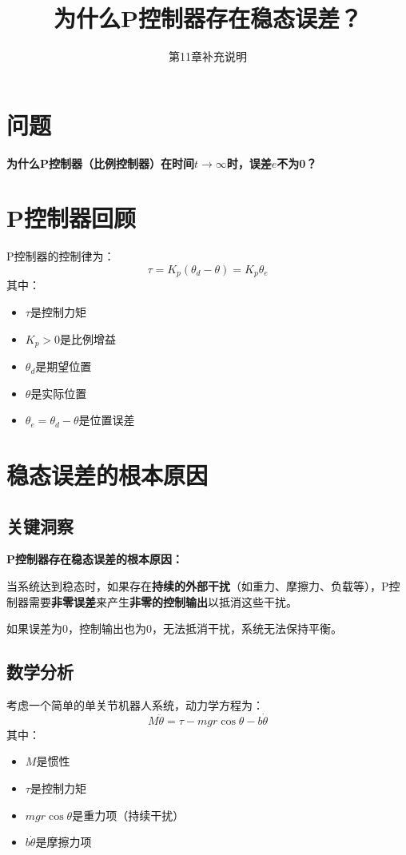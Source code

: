 \documentclass[12pt,a4paper]{article}
\title{为什么P控制器存在稳态误差？}
\author{第11章补充说明}
\date{}
\begin{document}
\maketitle

\section{问题}

\textbf{为什么P控制器（比例控制器）在时间$t \to \infty$时，误差$e$不为0？}

\section{P控制器回顾}

P控制器的控制律为：
\begin{equation}
\tau = K_p(\theta_d - \theta) = K_p \theta_e
\end{equation}
其中：
\begin{itemize}
\item $\tau$是控制力矩
\item $K_p > 0$是比例增益
\item $\theta_d$是期望位置
\item $\theta$是实际位置
\item $\theta_e = \theta_d - \theta$是位置误差
\end{itemize}

\section{稳态误差的根本原因}

\subsection{关键洞察}

\textbf{P控制器存在稳态误差的根本原因：}

当系统达到稳态时，如果存在\textbf{持续的外部干扰}（如重力、摩擦力、负载等），P控制器需要\textbf{非零误差}来产生\textbf{非零的控制输出}以抵消这些干扰。

如果误差为0，控制输出也为0，无法抵消干扰，系统无法保持平衡。

\subsection{数学分析}

考虑一个简单的单关节机器人系统，动力学方程为：
\begin{equation}
M\ddot{\theta} = \tau - mgr\cos\theta - b\dot{\theta}
\end{equation}
其中：
\begin{itemize}
\item $M$是惯性
\item $\tau$是控制力矩
\item $mgr\cos\theta$是重力项（持续干扰）
\item $b\dot{\theta}$是摩擦力项
\end{itemize}
\end{document}
